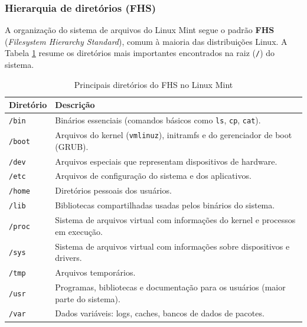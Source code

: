 \documentclass[a4paper,12pt]{article}
\begin{document}
\subsubsection{Hierarquia de diretórios (FHS)}

A organização do sistema de arquivos do Linux Mint segue o padrão
\textbf{FHS} (\textit{Filesystem Hierarchy Standard}), comum à maioria das
distribuições Linux. A Tabela \ref{tab:fhs} resume os diretórios mais
importantes encontrados na raiz (\texttt{/}) do sistema.

\begin{table}[h]
    \centering
    \begin{tabular}{|l|p{10cm}|}
        \hline
        \textbf{Diretório} & \textbf{Descrição} \\ \hline
        \texttt{/bin}  & Binários essenciais (comandos básicos como
                          \texttt{ls}, \texttt{cp}, \texttt{cat}). \\ \hline
        \texttt{/boot} & Arquivos do kernel (\texttt{vmlinuz}), initramfs
                          e do gerenciador de boot (GRUB). \\ \hline
        \texttt{/dev}  & Arquivos especiais que representam dispositivos
                          de hardware. \\ \hline
        \texttt{/etc}  & Arquivos de configuração do sistema e dos
                          aplicativos. \\ \hline
        \texttt{/home} & Diretórios pessoais dos usuários. \\ \hline
        \texttt{/lib}  & Bibliotecas compartilhadas usadas pelos
                          binários do sistema. \\ \hline
        \texttt{/proc} & Sistema de arquivos virtual com informações do
                          kernel e processos em execução. \\ \hline
        \texttt{/sys}  & Sistema de arquivos virtual com informações
                          sobre dispositivos e drivers. \\ \hline
        \texttt{/tmp}  & Arquivos temporários. \\ \hline
        \texttt{/usr}  & Programas, bibliotecas e documentação para os
                          usuários (maior parte do sistema). \\ \hline
        \texttt{/var}  & Dados variáveis: logs, caches, bancos de dados
                          de pacotes. \\ \hline
    \end{tabular}
    \caption{Principais diretórios do FHS no Linux Mint}
    \label{tab:fhs}
\end{table}
\end{document}
